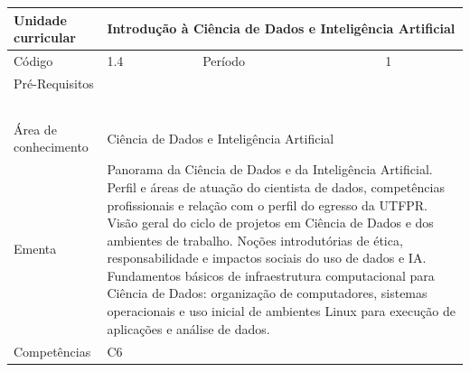 \clearpage
\newpage

\begin{quadro}[ht!]
  \centering\scriptsize
\caption{Unidade Curricular Introdução à Ciência de Dados e Inteligência Artificial}

\begin{tabular}{|p{2.5cm}|p{2.5cm}|p{2.5cm}|p{2.5cm}|p{2.5cm}|}\hline

  Unidade curricular & \multicolumn{4}{p{10cm}|}{ Introdução à Ciência de Dados e Inteligência Artificial }\\\hline
  Código & 1.4 & Período & \multicolumn{2}{p{5cm}|}{ 1 }\\\hline
  Pré-Requisitos & \multicolumn{4}{p{10cm}|}{  } \\\hline
  \cellcolor{blue1}{ CH PRESENCIAL } &
    \cellcolor{blue1}{CH EAD Síncrona} &
    \cellcolor{blue1}{CH EAD Síncrona Mediada} &
    \cellcolor{blue1}{CH EAD Assíncrona} &
    \cellcolor{blue1}{CH APCC} \\\hline
  \cellcolor{blue1}{ 60 } &
    \cellcolor{blue1}{ 0 } &
    \cellcolor{blue1}{ 0 } &
    \cellcolor{blue1}{ 0 } &
    \cellcolor{blue1}{0} \\\hline
  \cellcolor{blue1}{ CH Teórica } &
    \cellcolor{blue1}{CH Prática} &
    \cellcolor{blue1}{CH Humanidades} &
    \cellcolor{blue1}{CH Extensão} &
    \cellcolor{blue1}{CH EAD TOTAL} \\\hline
  \cellcolor{blue1}{ 30 } &
    \cellcolor{blue1}{ 30 } &
    \cellcolor{blue1}{ 0 } &
    \cellcolor{blue1}{ 0 } &
    \cellcolor{blue1}{ 0 } \\\hline
  \cellcolor{blue1}{CARGA-HORÁRIA TOTAL} & \multicolumn{4}{p{10cm}|}{ \cellcolor{blue1}{ 60 } } \\\hline
  Área de conhecimento & \multicolumn{4}{p{10cm}|}{ Ciência de Dados e Inteligência Artificial } \\\hline
  Ementa & \multicolumn{4}{p{10cm}|}{ Panorama da Ciência de Dados e da Inteligência Artificial. Perfil e áreas de atuação do cientista de dados, competências profissionais e relação com o perfil do egresso da UTFPR. Visão geral do ciclo de projetos em Ciência de Dados e dos ambientes de trabalho. Noções introdutórias de ética, responsabilidade e impactos sociais do uso de dados e IA. Fundamentos básicos de infraestrutura computacional para Ciência de Dados: organização de computadores, sistemas operacionais e uso inicial de ambientes Linux para execução de aplicações e análise de dados. } \\\hline
  Competências & \multicolumn{4}{p{10cm}|}{ C6 } \\\hline


  
	\end{tabular}

\end{quadro}


